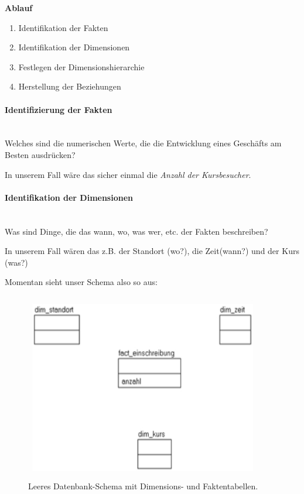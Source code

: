 \documentclass[a4paper, 11pt, nofootinbib]{article}
\begin{document}
\vspace{10px}

\noindent \textbf{Ablauf}

\begin{enumerate}
	\item Identifikation der Fakten
	\item Identifikation der Dimensionen
	\item Festlegen der Dimensionshierarchie
	\item Herstellung der Beziehungen
\end{enumerate}

\paragraph{Identifizierung der Fakten}\mbox{}\\
Welches sind die numerischen Werte, die die Entwicklung eines Geschäfts am Besten ausdrücken? 

\vspace{10px}

\noindent In unserem Fall wäre das sicher einmal die \textit{Anzahl der Kursbesucher}.

\paragraph{Identifikation der Dimensionen}\mbox{}\\
Was sind Dinge, die das wann, wo, was wer, etc. der Fakten beschreiben?  

\vspace{10px}

\noindent In unserem Fall wären das z.B. der Standort (wo?), die Zeit(wann?) und der Kurs (was?)

Momentan sieht unser Schema also so aus:

\begin{figure}[htb]
	\centering
	\includegraphics[keepaspectratio=true,height=10\baselineskip]{db-schema_empty.jpg}
	\caption{Leeres Datenbank-Schema mit Dimensions- und Faktentabellen.}
	\label{fig:empty_schema}
\end{figure}
\end{document}
